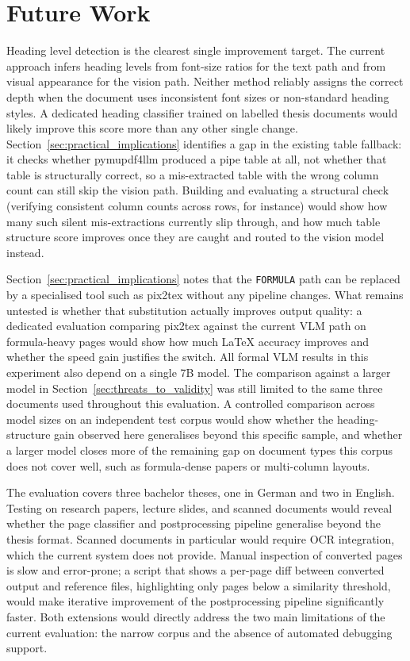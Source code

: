 \section{Future Work}

Heading level detection is the clearest single improvement target. The
current approach infers heading levels from font-size ratios for the text
path and from visual appearance for the vision path.
Neither method reliably assigns the correct depth when the document uses
inconsistent font sizes or non-standard heading styles. A dedicated heading
classifier trained on labelled thesis documents would likely improve this score
more than any other single change. Section~\ref{sec:practical_implications} identifies a gap in the existing table fallback: it checks whether pymupdf4llm produced
a pipe table at all, not whether that table is structurally correct, so a
mis-extracted table with the wrong column count can still skip the vision path.
Building and evaluating a structural check (verifying consistent column counts
across rows, for instance) would show how many such silent mis-extractions
currently slip through, and how much table structure score improves once they
are caught and routed to the vision model instead.

Section~\ref{sec:practical_implications} notes that the \texttt{FORMULA} path
can be replaced by a specialised tool such as pix2tex without any pipeline
changes. What remains untested is whether that substitution actually improves
output quality: a dedicated evaluation comparing pix2tex against the current
VLM path on formula-heavy pages would show how much \LaTeX{} accuracy improves
and whether the speed gain justifies the switch.
All formal VLM results in this experiment also depend on a single 7B model.
The comparison against a larger model in Section~\ref{sec:threats_to_validity}
was still limited to the same three documents used throughout this
evaluation. A controlled comparison across model sizes on an independent
test corpus would show whether the heading-structure gain observed here
generalises beyond this specific sample, and whether a larger model closes
more of the remaining gap on document types this corpus does not cover
well, such as formula-dense papers or multi-column layouts.

The evaluation covers three bachelor theses, one in German and two in English. Testing on research papers,
lecture slides, and scanned documents would reveal whether the page classifier and
postprocessing pipeline generalise beyond the thesis format. Scanned documents in
particular would require OCR integration, which the current system does not
provide. Manual inspection of converted pages is slow and error-prone; a script
that shows a per-page diff between converted output and reference files,
highlighting only pages below a similarity threshold, would make iterative
improvement of the postprocessing pipeline significantly faster. Both extensions
would directly address the two main limitations of the current evaluation: the
narrow corpus and the absence of automated debugging support.
